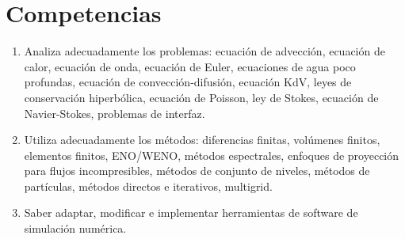 \section{Competencias}

\begin{enumerate}[label=\arabic*., font=\bfseries, nosep]
  \item

        Analiza adecuadamente los problemas: ecuación de advección,
        ecuación de calor, ecuación de onda, ecuación de Euler,
        ecuaciones de agua poco profundas, ecuación de
        convección-difusión, ecuación KdV, leyes de conservación
        hiperbólica, ecuación de Poisson, ley de Stokes, ecuación de
        Navier-Stokes, problemas de interfaz.

  \item

        Utiliza adecuadamente los métodos: diferencias finitas,
        volúmenes finitos, elementos finitos, ENO/WENO, métodos
        espectrales, enfoques de proyección para flujos
        incompresibles, métodos de conjunto de niveles, métodos de
        partículas, métodos directos e iterativos, multigrid.

  \item

        Saber adaptar, modificar e implementar herramientas de
        software de simulación numérica.
\end{enumerate}